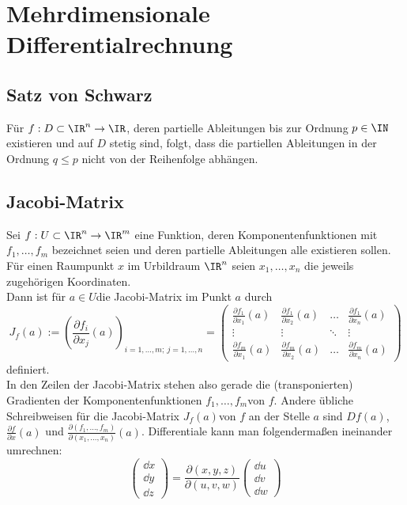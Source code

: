 \section{Mehrdimensionale Differentialrechnung}
\subsection{Satz von Schwarz}\label{SvS}
Für $f:D\subset \IR^n\rightarrow \IR$, deren partielle Ableitungen bis zur Ordnung $p\in\IN$ existieren und auf $D$ stetig sind, folgt, dass die partiellen Ableitungen in der Ordnung $q\leq p$ nicht von der Reihenfolge abhängen.
\subsection{Jacobi-Matrix}\label{Jac}
Sei $f: U \subset \IR^n \to \IR^m$ eine Funktion, deren Komponentenfunktionen mit $f_1 , \dots, f_m$ bezeichnet seien und deren partielle Ableitungen alle existieren sollen. Für einen Raumpunkt $x$ im Urbildraum $\IR^n$ seien $x_1, \dots, x_n$ die jeweils zugehörigen Koordinaten. \\
Dann ist für $a \in U$die Jacobi-Matrix im Punkt $a$ durch
\begin{equation}
	J_f(a) := \left(\frac{\partial f_i}{\partial x_j}(a)\right)_{i=1,\ldots,m;\ j=1,\ldots,n} =  \begin{pmatrix}
		\frac{\partial f_1}{\partial x_1}(a) & \frac{\partial f_1}{\partial x_2}(a) & \ldots & \frac{\partial f_1}{\partial x_n}(a) \\
		\vdots & \vdots & \ddots & \vdots \\
		\frac{\partial f_m}{\partial x_1}(a) & \frac{\partial f_m}{\partial x_2}(a) & \ldots & \frac{\partial f_m}{\partial x_n} (a)
	\end{pmatrix}
\end{equation}
definiert.\\
In den Zeilen der Jacobi-Matrix stehen also gerade die (transponierten) Gradienten der Komponentenfunktionen $f_1, \dots, f_m$von $f$.
Andere übliche Schreibweisen für die Jacobi-Matrix $J_f(a)$von $f$ an der Stelle $a$ sind $Df(a)$, $\frac{\partial f}{\partial x}(a)$ und $\textstyle\frac{\partial(f_1, \ldots, f_m)}{\partial(x_1, \ldots, x_n)}(a)$. Differentiale kann man folgendermaßen ineinander umrechnen:
\begin{equation}
	\begin{pmatrix}
		\dd x\\
		\dd y\\
		\dd z
	\end{pmatrix}=\frac{\partial (x,y,z)}{\partial (u,v,w)}	\begin{pmatrix}
	\dd u\\
	\dd v\\
	\dd w
	\end{pmatrix}
\end{equation}

